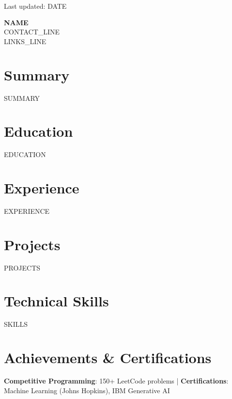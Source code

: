 \documentclass[a4paper,10pt]{article}
\begin{document}
\begin{flushright}
{\small Last updated: {{DATE}}}
\end{flushright}
\vspace{-20pt}

\begin{center}
{\fontsize{28}{32}\selectfont \textbf{{{NAME}}}}\\[2pt]
{{CONTACT_LINE}}\\[1pt]
{{LINKS_LINE}}
\end{center}
\vspace{-2pt}

\section*{Summary}
{{SUMMARY}}

\section*{Education}
{{EDUCATION}}

\section*{Experience}

{{EXPERIENCE}}

\section*{Projects}

{{PROJECTS}}

\section*{Technical Skills}
{{SKILLS}}

\section*{Achievements & Certifications}
\textbf{Competitive Programming}: 150+ LeetCode problems \;|\; \textbf{Certifications}: Machine Learning (Johns Hopkins), IBM Generative AI
\end{document}
